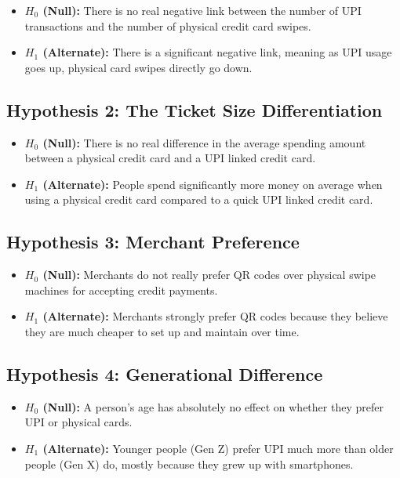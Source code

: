 \begin{itemize}
    \item \textbf{$H_{0}$ (Null):} There is no real negative link between the number of UPI transactions and the number of physical credit card swipes.
    \item \textbf{$H_{1}$ (Alternate):} There is a significant negative link, meaning as UPI usage goes up, physical card swipes directly go down.
\end{itemize}

\subsection{Hypothesis 2: The Ticket Size Differentiation}

\begin{itemize}
    \item \textbf{$H_{0}$ (Null):} There is no real difference in the average spending amount between a physical credit card and a UPI linked credit card.
    \item \textbf{$H_{1}$ (Alternate):} People spend significantly more money on average when using a physical credit card compared to a quick UPI linked credit card.
\end{itemize}

\subsection{Hypothesis 3: Merchant Preference}

\begin{itemize}
    \item \textbf{$H_{0}$ (Null):} Merchants do not really prefer QR codes over physical swipe machines for accepting credit payments.
    \item \textbf{$H_{1}$ (Alternate):} Merchants strongly prefer QR codes because they believe they are much cheaper to set up and maintain over time.
\end{itemize}

\subsection{Hypothesis 4: Generational Difference}

\begin{itemize}
    \item \textbf{$H_{0}$ (Null):} A person's age has absolutely no effect on whether they prefer UPI or physical cards.
    \item \textbf{$H_{1}$ (Alternate):} Younger people (Gen Z) prefer UPI much more than older people (Gen X) do, mostly because they grew up with smartphones.
\end{itemize}

